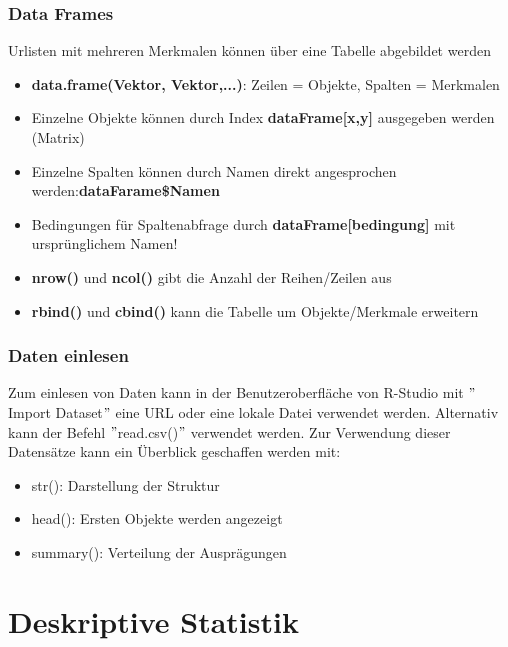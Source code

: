 \documentclass[a4paper,10pt]{scrartcl}
\begin{document}
\subsubsection{Data Frames}
Urlisten mit mehreren Merkmalen können über eine Tabelle abgebildet werden\newline
\begin{itemize}
\item\textbf{data.frame(Vektor, Vektor,...)}: Zeilen = Objekte, Spalten = Merkmalen
\item Einzelne Objekte können durch Index \textbf{dataFrame[x,y]} ausgegeben werden (Matrix)
\item Einzelne Spalten können durch Namen direkt angesprochen werden:\newline \textbf{dataFarame\$Namen}
\item Bedingungen für Spaltenabfrage durch \textbf{dataFrame[bedingung]} mit ursprünglichem Namen!
\item \textbf{nrow()} und \textbf{ncol()} gibt die Anzahl der Reihen/Zeilen aus
\item \textbf{rbind()} und \textbf{cbind()} kann die Tabelle um Objekte/Merkmale erweitern 
\end{itemize}

\subsubsection{Daten einlesen}
Zum einlesen von Daten kann in der Benutzeroberfläche von R-Studio mit $"$Import Dataset$"$ eine URL oder eine lokale Datei verwendet werden. Alternativ kann der Befehl $"$read.csv()$"$ verwendet werden.
Zur Verwendung dieser Datensätze kann ein Überblick geschaffen werden mit:
\begin{itemize}
    \item str(): Darstellung der Struktur
    \item head(): Ersten Objekte werden angezeigt
    \item summary(): Verteilung der Ausprägungen
\end{itemize}
\newpage
\section{Deskriptive Statistik}
\end{document}
